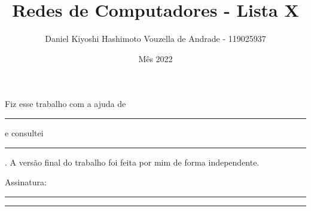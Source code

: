 \documentclass{article}
\title{Redes de Computadores - Lista X}
\author{Daniel Kiyoshi Hashimoto Vouzella de Andrade - 119025937}
\date{Mês 2022}
\newcommand{\blank}{\rule[0pt]{5em}{.3pt}}
\newcommand{\preamble}[2]{\noindent%
    Fiz esse trabalho com a ajuda de {\bfseries #1}
    e consultei {\bfseries #2}.
    A versão final do trabalho foi feita
    por mim de forma independente.
    \par\noindent Assinatura: \blank\blank\bigskip}
\begin{document}
\maketitle

\preamble{\blank}{\blank}
\end{document}
